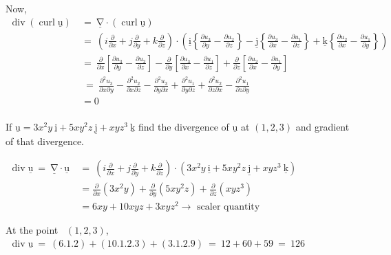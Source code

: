 \documentclass[12pt]{article}
\renewcommand{\vec}[1]{\underline{\mathrm{#1}}}
\begin{document}
\begin{enumerate}[label=\textbf{\mred{(\roman*)}}]
Now,\\
$\begin{aligned}
\operatorname{div}\left(\operatorname{curl} \vec{u}\right) \ & = \ \vec{\nabla} \cdot (\operatorname{curl} \vec{u})\\[1ex]
\ &= \ \left(i\frac{\partial}{\partial{x}} + j\frac{\partial}{\partial{y}} + k\frac{\partial}{\partial{z}}\right) \cdot \left(\vec{i}\left\{\frac{\partial u_3}{\partial y}-\frac{\partial u_2}{\partial z}\right\} - \vec{j}\left\{\frac{\partial u_3}{\partial x}-\frac{\partial u_1}{\partial z}\right\} + \vec{k}\left\{\frac{\partial u_2}{\partial x}-\frac{\partial u_1}{\partial y}\right\}\right) \\[2ex]
\ &= \
\frac{\partial}{\partial x}\left[\frac{\partial u_3}{\partial y}-\frac{\partial u_2}{\partial z}\right] 
-\frac{\partial}{\partial y}\left[\frac{\partial u_3}{\partial x}-\frac{\partial u_1}{\partial z}\right] 
+\frac{\partial}{\partial z}\left[\frac{\partial u_2}{\partial x}-\frac{\partial u_1}{\partial y}\right] \\[2ex]
& \ = \
\frac{\partial^2 u_3}{\partial x \partial y} -
\frac{\partial^2 u_2}{\partial x \partial z} -
\frac{\partial^2 u_3}{\partial y \partial x} +
\frac{\partial^2 u_1}{\partial y \partial z} +
\frac{\partial^2 u_2}{\partial z \partial x} -
\frac{\partial^2 u_1}{\partial z \partial y} \\
& = 0 \\
\end{aligned}$
\end{enumerate}

\vspace{8ex}
\textbf{} If $\vec{u}=3x^2y \ \vec{i}+5xy^2z \ \vec{j}+xyz^3 \ \vec{k}$ find the divergence of $\vec{u}$ at $(1,2,3)$ and gradient of that divergence.

\Heading{Solution:}
$\begin{aligned}
\operatorname{div} \vec{u}
\ = \ \vec{\nabla} \cdot \vec{u}
\ &= \ \left(i\frac{\partial}{\partial{x}} + j\frac{\partial}{\partial{y}} + k\frac{\partial}{\partial{z}}\right) \cdot \left(3x^2y \ \vec{i}+5xy^2z \ \vec{j}+xyz^3 \ \vec{k}\right) \\[1ex]
&=\frac{\partial}{\partial x}\left(3 x^2 y\right)+\frac{\partial}{\partial y}\left(5 x y^2 z\right)+\frac{\partial}{\partial z}\left(x y z^3\right) \\
&=6 x y+10 x y z+3 x y z^2 \rightarrow \text { scaler quantity }
\end{aligned}$

\vspace{3ex}
At the point \ $(1,2,3)$,\quad 
$\begin{aligned}
   \operatorname{div} \vec{u}
\ = \ (6.1.2) + (10.1.2.3) + (3.1.2.9)
\ = \ 12+60+59 \ = \ 126
\end{aligned}$
\end{document}
